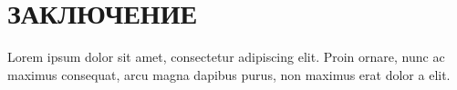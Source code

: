 \newpage
\section*{ЗАКЛЮЧЕНИЕ}

Lorem ipsum dolor sit amet, consectetur adipiscing elit. Proin ornare, nunc ac maximus consequat, arcu magna dapibus
purus, non maximus erat dolor a elit.
